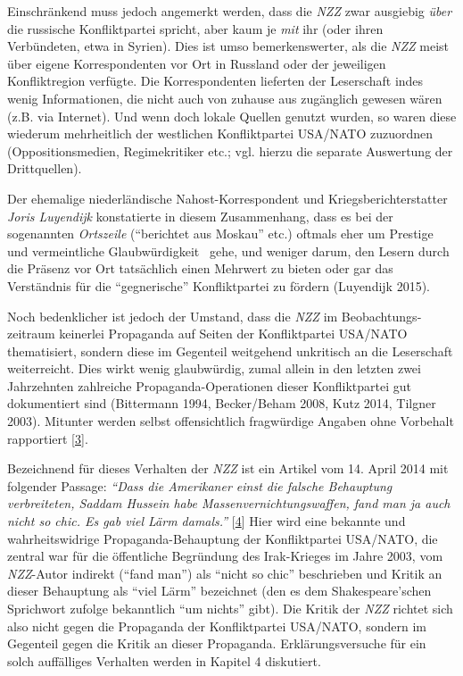 Einschränkend muss jedoch angemerkt werden, dass die \emph{NZZ} zwar
ausgiebig \emph{über} die russische Konfliktpartei spricht, aber kaum je
\emph{mit} ihr (oder ihren Verbündeten, etwa in Syrien). Dies ist umso
bemerkenswerter, als die \emph{NZZ} meist über eigene Korrespondenten
vor Ort in Russland oder der jeweiligen Konfliktregion verfügte. Die
Korrespondenten lieferten der Leserschaft indes wenig Informationen, die
nicht auch von zuhause aus zugänglich gewesen wären (z.B. via Internet).
Und wenn doch lokale Quellen genutzt wurden, so waren diese wiederum
mehrheitlich der westlichen Konfliktpartei USA/NATO zuzuordnen
(Oppositions­medien, Regimekritiker etc.; vgl. hierzu die separate
Auswertung der Drittquellen).

Der ehemalige niederländische Nahost-Korrespondent und
Kriegsberichterstatter \emph{Joris Luyendijk} konstatierte in diesem
Zusammenhang, dass es bei der sogenannten \emph{Ortszeile} (``berichtet
aus Moskau'' etc.) oftmals eher um Prestige und vermeintliche
Glaubwürdigkeit~ gehe, und weniger darum, den Lesern durch die Präsenz
vor Ort tatsächlich einen Mehrwert zu bieten oder gar das Verständnis
für die ``gegnerische'' Konfliktpartei zu fördern (Luyendijk 2015).

Noch bedenklicher ist jedoch der Umstand, dass die \emph{NZZ} im
Beobachtungs­zeitraum keinerlei Propaganda auf Seiten der Konfliktpartei
USA/NATO thematisiert, sondern diese im Gegenteil weitgehend unkritisch
an die Leserschaft weiterreicht. Dies wirkt wenig glaubwürdig, zumal
allein in den letzten zwei Jahrzehnten zahlreiche Propaganda-Operationen
dieser Konfliktpartei gut dokumentiert sind (Bittermann 1994,
Becker/Beham 2008, Kutz 2014, Tilgner 2003). Mitunter werden selbst
offensichtlich fragwürdige Angaben ohne Vorbehalt rapportiert
{[}\protect\hyperlink{anm3}{3}{]}.

Bezeichnend für dieses Verhalten der \emph{NZZ} ist ein Artikel vom 14.
April 2014 mit folgender Passage: \emph{``Dass die Amerikaner einst die
falsche Behauptung verbreiteten, Saddam Hussein habe
Massen­vernichtungs­waffen, fand man ja auch nicht so chic. Es gab viel
Lärm damals.''} {[}\protect\hyperlink{anm4}{4}{]} Hier wird eine
bekannte und wahrheitswidrige Propaganda-Behauptung der Konfliktpartei
USA/NATO, die zentral war für die öffentliche Begründung des
Irak-Krieges im Jahre 2003, vom \emph{NZZ}-Autor indirekt (``fand man'')
als ``nicht so chic'' beschrieben und Kritik an dieser Behauptung als
``viel Lärm'' bezeichnet (den es dem Shakespeare'schen Sprichwort
zufolge bekanntlich ``um nichts'' gibt). Die Kritik der \emph{NZZ}
richtet sich also nicht gegen die Propaganda der Konfliktpartei
USA/NATO, sondern im Gegenteil gegen die Kritik an dieser Propaganda.
Erklärungs­versuche für ein solch auffälliges Verhalten werden in
Kapitel 4 diskutiert.

